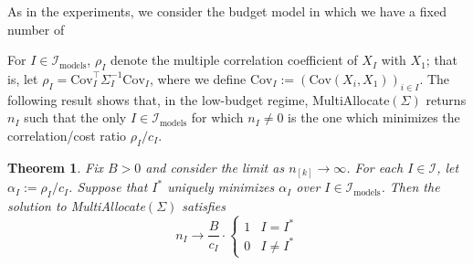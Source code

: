 \documentclass{article} %
\newtheorem{theorem}{Theorem}
\begin{document}
As in the experiments, we consider the budget model in which we have a fixed number of 

For $I\in\mathcal{I}_{\text{models}}$, $\rho_I$ denote the multiple correlation coefficient of $X_I$ with $X_1$; that is, let $\rho_I = \text{Cov}_I^\top \Sigma_I^{-1} \text{Cov}_I$, where we define $\text{Cov}_I:=(\text{Cov}(X_i,X_1))_{i\in I}$. The following result shows that, in the low-budget regime, MultiAllocate$(\Sigma)$ returns $n_I$ such that the only $I\in\mathcal{I}_{\text{models}}$ for which $n_I\neq0$ is the one which minimizes the correlation/cost ratio $\rho_I/c_I$.

\begin{theorem}\label{thm:limiting}
    Fix $B>0$ and consider the limit as $n_{[k]}\to\infty$. For each $I\in\mathcal{I}$, let $\alpha_I:=\rho_I/c_I$. Suppose that $I^*$ uniquely minimizes $\alpha_I$ over $I\in\mathcal{I}_{\text{models}}$. Then the solution to MultiAllocate$(\Sigma)$ satisfies 
    \[
    n_I\longrightarrow \frac{B}{c_{I}}\cdot \begin{cases}
        1 & I=I^* \\
        0 & I\neq I^*
    \end{cases} 
    \]
\end{theorem}

\end{document}
